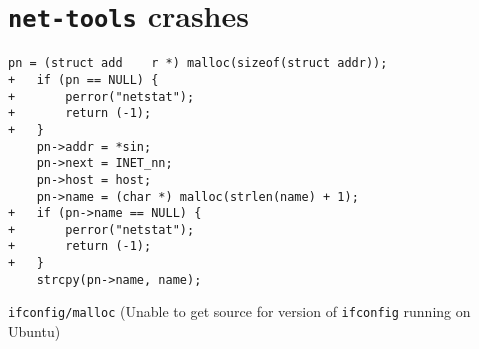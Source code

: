 \section{\texttt{net-tools} crashes}

\lstset{numbers=left}
\begin{lstlisting}[label={lst:netstat/malloc},firstnumber=213, caption={\texttt{netstat} crashes when \texttt{malloc} returns an error. The offending code is in the \texttt{net-tools} 1.60 source code, in \texttt{lib/inet.c:213}.}]
    pn = (struct add	r *) malloc(sizeof(struct addr));
+   if (pn == NULL) {
+   	perror("netstat");
+		return (-1);
+   }
    pn->addr = *sin;
    pn->next = INET_nn;
    pn->host = host;
    pn->name = (char *) malloc(strlen(name) + 1);
+   if (pn->name == NULL) {
+   	perror("netstat");
+		return (-1);
+   }
    strcpy(pn->name, name);
\end{lstlisting}

\texttt{ifconfig/malloc}
(Unable to get source for version of \texttt{ifconfig} running on Ubuntu)\\
